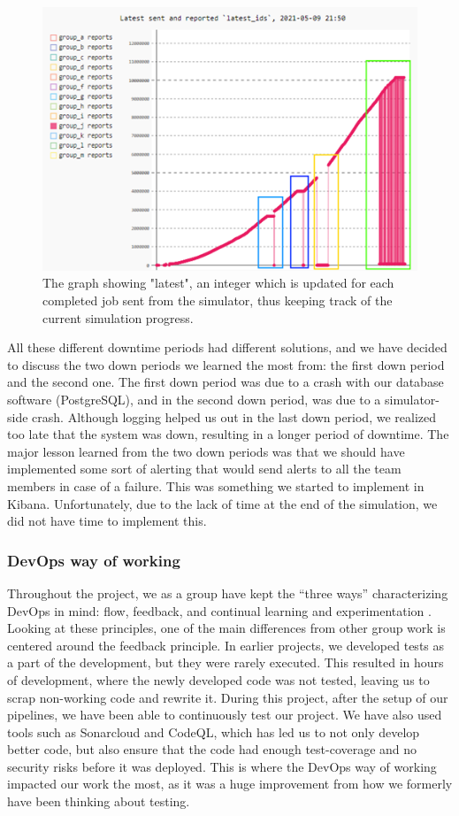 \begin{figure}[h!]
    \centering
    \includegraphics[scale=0.7]{images/downperiodes.png}
    \caption{The graph showing "latest", an integer which is updated for each completed job sent from the simulator, 
    thus keeping track of the current simulation progress. }
\end{figure}
 
All these different downtime periods had different solutions, and we have decided to discuss the two down periods we 
learned the most from: the first down period and the second one. 
The first down period was due to a crash with our database software (PostgreSQL), and in the second down period, 
was due to a simulator-side crash. Although logging helped us out in the last down period, 
we realized too late that the system was down, resulting in a longer period of downtime. 
The major lesson learned from the two down periods was that we should have implemented some sort of alerting 
that would send alerts to all the team members in case of a failure. This was something we started to 
implement in Kibana. Unfortunately, due to the lack of time at the end of the simulation, we did not have time to implement this.

\subsubsection{DevOps way of working}
Throughout the project, we as a group have kept the “three ways” characterizing DevOps in mind: 
flow, feedback, and continual learning and experimentation \cite{devopshandbook}.
Looking at these principles, one of the main differences from other group work is centered around 
the feedback principle. In earlier projects, we developed tests as a part of the development, 
but they were rarely executed. This resulted in hours of development, where the newly developed code was 
not tested, leaving us to scrap non-working code and rewrite it. 
During this project, after the setup of our pipelines, we have been able to continuously test our project. 
We have also used tools such as Sonarcloud and CodeQL, which has led us to not only develop better code, 
but also ensure that the code had enough test-coverage and no security risks before it was deployed. 
This is where the DevOps way of working impacted our work the most, as it was a huge improvement 
from how we formerly have been thinking about testing.
